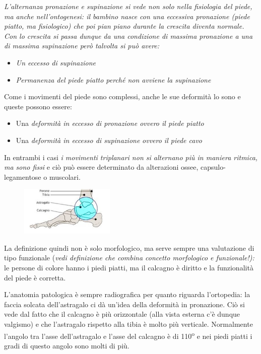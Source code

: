 \emph{L'alternanza pronazione e supinazione si vede non solo nella fisiologia del piede, ma anche nell'ontogenesi: il bambino nasce con una eccessiva pronazione (piede piatto, ma fisiologico) che poi pian piano durante la crescita diventa normale. Con lo crescita si passa dunque da una condizione di massima pronazione a una di massima supinazione però talvolta si può avere:}

\begin{itemize}
\item
  \emph{Un eccesso di supinazione}
\item
  \emph{Permanenza del piede piatto perché non avviene la supinazione}
\end{itemize}

Come i movimenti del piede sono complessi, anche le sue deformità lo sono e queste possono essere:

\begin{itemize}
\item
  Una \emph{deformità in eccesso di pronazione ovvero il piede piatto}
\item
  Una \emph{deformità in eccesso di supinazione} \emph{ovvero il piede cavo}
\end{itemize}

In entrambi i casi \emph{i movimenti triplanari non si alternano più in maniera ritmica, ma sono fissi} e ciò può essere determinato da alterazioni ossee, capsulo-legamentose o muscolari.

\begin{figure}[!ht]
\centering
\includegraphics[width=0.4\textwidth]{014/image3.png}
\end{figure}

La definizione quindi non è solo morfologico, ma serve sempre una valutazione di tipo funzionale (\emph{vedi definizione che combina concetto morfologico e funzionale!):} le persone di colore hanno i piedi piatti, ma il calcagno è diritto e la funzionalità del piede è corretta.

L'anatomia patologica è sempre radiografica per quanto riguarda l'ortopedia: la faccia solcata dell'astragalo ci dà un'idea della deformità in pronazione. Ciò si vede dal fatto che il calcagno è più orizzontale (alla vista esterna c'è dunque valgismo) e che l'astragalo rispetto alla tibia è molto più verticale. Normalmente l'angolo tra
l'asse dell'astragalo e l'asse del calcagno è di 110\textsuperscript{o} e nei piedi piatti i gradi di questo angolo sono molti di più.

